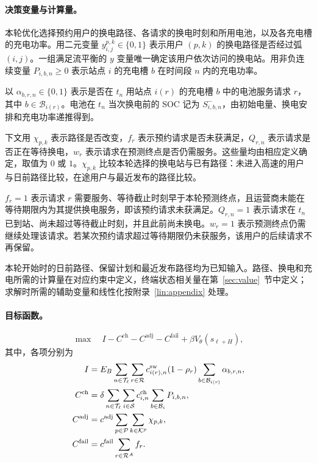\paragraph{决策变量与计算量。}
本轮优化选择预约用户的换电路径、各请求的换电时刻和所用电池，以及各充电槽的充电功率。用二元变量 $y_{i,j}^{p,k}\in\{0,1\}$ 表示用户 $(p,k)$ 的换电路径是否经过弧 $(i,j)$。一组满足流平衡的 $y$ 变量唯一确定该用户依次访问的换电站。用非负连续变量 $P_{i,b,n}\ge0$ 表示站点 $i$ 的充电槽 $b$ 在时间段 $n$ 内的充电功率。

以 $\alpha_{b,r,n}\in\{0,1\}$ 表示是否在 $t_n$ 用站点 $i(r)$ 的充电槽 $b$ 中的电池服务请求 $r$，其中 $b\in\mathcal B_{i(r)}$。电池在 $t_n$ 当次换电前的 SOC 记为 $S_{i,b,n}^{-}$，由初始电量、换电安排和充电功率递推得到。

下文用 $\chi_{p,k}$ 表示路径是否改变，$f_r$ 表示预约请求是否未获满足，$Q_{r,n}$ 表示请求是否正在等待换电，$w_r$ 表示请求在预测终点是否仍需服务。这些量均由相应定义确定，取值为 $0$ 或 $1$。$\chi_{p,k}$ 比较本轮选择的换电站与已有路径：未进入高速的用户与日前路径比较，在途用户与最近发布的路径比较。

$f_r=1$ 表示请求 $r$ 需要服务、等待截止时刻早于本轮预测终点，且运营商未能在等待期限内为其提供换电服务，即该预约请求未获满足。$Q_{r,n}=1$ 表示请求在 $t_n$ 已到站、尚未超过等待截止时刻，并且此前尚未换电。$w_r=1$ 表示预测终点仍需继续处理该请求。若某次预约请求超过等待期限仍未获服务，该用户的后续请求不再保留。

本轮开始时的日前路径、保留计划和最近发布路径均为已知输入。路径、换电和充电所需的计算量在对应约束中定义，终端状态相关量在第~\ref{sec:value}~节中定义；求解时所需的辅助变量和线性化按附录~\ref{lin:appendix} 处理。

\paragraph{目标函数。}

\begin{equation}
\max\quad I-C^{\mathrm{ch}}-C^{\mathrm{adj}}-C^{\mathrm{fail}}
+\beta V_\theta(s_{\ell+H}),
\label{eq:objective}
\end{equation}
其中，各项分别为
\[
\begin{aligned}
I&=E_B\sum_{n\in\mathcal T_\ell}\sum_{r\in\mathcal R}
c_{i(r),n}^{\mathrm{sw}}(1-\rho_r)\sum_{b\in\mathcal B_{i(r)}}\alpha_{b,r,n},\\
C^{\mathrm{ch}}&=\delta\sum_{n\in\mathcal T_\ell}\sum_{i\in\mathcal S}
c_{i,n}^{\mathrm{ch}}\sum_{b\in\mathcal B_i}P_{i,b,n},\\
C^{\mathrm{adj}}&=c^{\mathrm{adj}}\sum_{p\in\mathcal P}\sum_{k\in\mathcal K^p}\chi_{p,k},\\
C^{\mathrm{fail}}&=c^{\mathrm{fail}}\sum_{r\in\mathcal R^A}f_r.
\end{aligned}
\]

